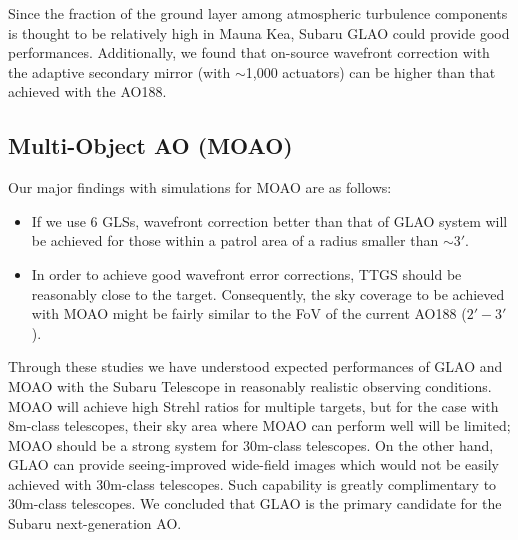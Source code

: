 Since the fraction of the ground layer among atmospheric turbulence
components is thought to be relatively high in Mauna Kea, Subaru GLAO
could provide good performances. Additionally, we found that on-source
wavefront correction with the adaptive secondary mirror (with
$\sim$1,000 actuators) can be higher than that achieved with the AO188. 


\subsection{Multi-Object AO (MOAO)}

Our major findings with simulations for MOAO are as follows:
\begin{itemize}
 \setlength{\itemsep}{-3pt}
 \item If we use 6 GLSs, wavefront correction better than that of GLAO
       system will be achieved for those within a patrol area of a
       radius smaller than $\sim 3'$.

 \item In order to achieve good wavefront error corrections, TTGS should
       be reasonably close to the target. Consequently, the sky
       coverage to be achieved with MOAO might be fairly similar to the
       FoV of the current AO188 ($2'-3'$).
\end{itemize}


Through these studies we have understood expected performances of GLAO 
and MOAO with the Subaru Telescope in reasonably realistic observing
conditions. MOAO will achieve high Strehl ratios for multiple targets,
but for the case with 8m-class telescopes, their sky area where MOAO can 
perform well will be limited; MOAO should be a strong system for
30m-class telescopes.
On the other hand, GLAO can provide seeing-improved wide-field images
which would not be easily achieved with 30m-class telescopes. Such
capability is greatly complimentary to 30m-class telescopes. We
concluded that GLAO is the primary candidate for the Subaru
next-generation AO. 

\bigskip




